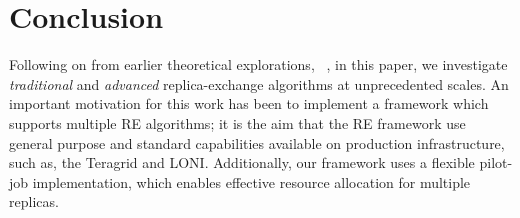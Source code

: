 \documentclass{rspublic}
\begin{document}

\section{Conclusion}
\label{sec:conclusion}

Following on from earlier theoretical explorations,
~\citep{parashar_arepex,DBLP:journals/jcc/GallicchioLP08}, in this
paper, we investigate {\it traditional} and {\it advanced}
replica-exchange algorithms at unprecedented scales.  An important
motivation for this work has been to implement a framework which
supports multiple RE algorithms; it is the aim that the RE
framework use general purpose and standard capabilities available
on production infrastructure, such as, the Teragrid and LONI.
Additionally, our framework uses a flexible pilot-job implementation,
which enables effective resource allocation for multiple replicas.
\end{document}
